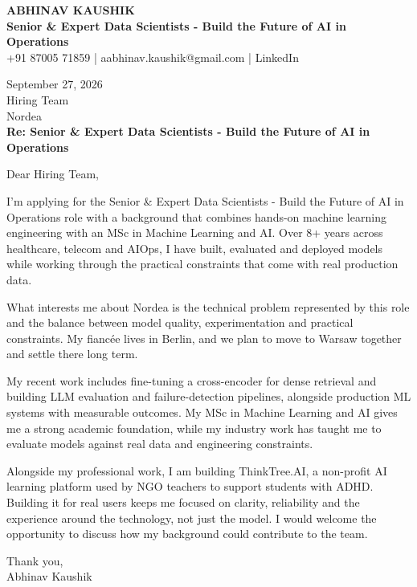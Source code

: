 \documentclass[10pt,a4paper]{article}
\begin{document}
\begin{center}
{\Large\bfseries ABHINAV KAUSHIK}\\[2pt]
{\bfseries Senior \& Expert Data Scientists - Build the Future of AI in Operations}\\[2pt]
+91 87005 71859 \quad | \quad aabhinav.kaushik@gmail.com \quad | \quad LinkedIn
\end{center}
\vspace{8pt}
September 27, 2026\\[6pt]
Hiring Team\\
Nordea\\[4pt]
\textbf{Re: Senior \& Expert Data Scientists - Build the Future of AI in Operations}

Dear Hiring Team,

I’m applying for the Senior \& Expert Data Scientists - Build the Future of AI in Operations role with a background that combines hands-on machine learning engineering with an MSc in Machine Learning and AI. Over 8+ years across healthcare, telecom and AIOps, I have built, evaluated and deployed models while working through the practical constraints that come with real production data.

What interests me about Nordea is the technical problem represented by this role and the balance between model quality, experimentation and practical constraints. My fiancée lives in Berlin, and we plan to move to Warsaw together and settle there long term.

My recent work includes fine-tuning a cross-encoder for dense retrieval and building LLM evaluation and failure-detection pipelines, alongside production ML systems with measurable outcomes. My MSc in Machine Learning and AI gives me a strong academic foundation, while my industry work has taught me to evaluate models against real data and engineering constraints.

Alongside my professional work, I am building ThinkTree.AI, a non-profit AI learning platform used by NGO teachers to support students with ADHD. Building it for real users keeps me focused on clarity, reliability and the experience around the technology, not just the model. I would welcome the opportunity to discuss how my background could contribute to the team.

Thank you,\\
Abhinav Kaushik
\end{document}
